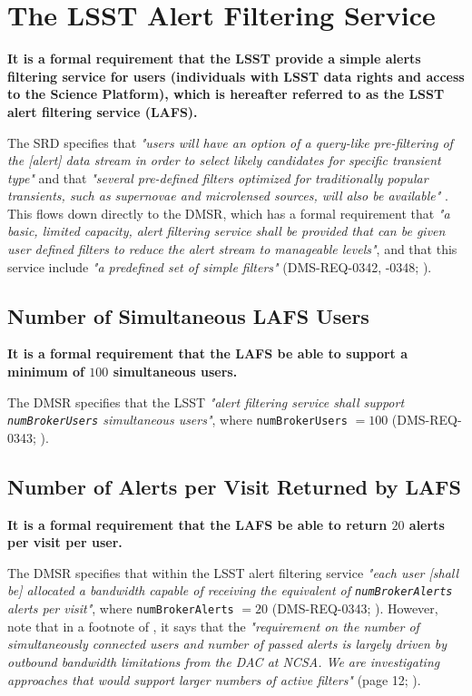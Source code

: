 \documentclass[DM,authoryear,toc]{lsstdoc}
\begin{document}
\section{The LSST Alert Filtering Service} \label{sec:LAFS}

{\bf It is a formal requirement that the LSST provide a simple alerts filtering service for users (individuals with LSST data rights and access to the Science Platform), which is hereafter referred to as the LSST alert filtering service (LAFS).}

The SRD specifies that {\it "users will have an option of a query-like pre-filtering of the [alert] data stream in order to select likely candidates for specific transient type"} and that {\it "several pre-defined filters optimized for traditionally popular transients, such as supernovae and microlensed sources, will also be available"} . This flows down directly to the DMSR, which has a formal requirement that {\it "a basic, limited capacity, alert filtering service shall be provided that can be given user defined filters to reduce the alert stream to manageable levels"}, and that this service include {\it "a predefined set of simple filters"} (DMS-REQ-0342, -0348; ). 


\subsection{Number of Simultaneous LAFS Users}\label{ssec:LAFS_users}

{\bf It is a formal requirement that the LAFS be able to support a minimum of $100$ simultaneous users.}

The DMSR specifies that the LSST {\it "alert filtering service shall support {\tt numBrokerUsers} simultaneous users"}, where {\tt numBrokerUsers} $=100$ (DMS-REQ-0343; ).


\subsection{Number of Alerts per Visit Returned by LAFS}\label{ssec:LAFS_returns}

{\bf It is a formal requirement that the LAFS be able to return $20$ alerts per visit per user.}

The DMSR specifies that within the LSST alert filtering service {\it "each user [shall be] allocated a bandwidth capable of receiving the equivalent of {\tt numBrokerAlerts} alerts per visit"}, where {\tt numBrokerAlerts} $=20$ (DMS-REQ-0343; ). However, note that in a footnote of , it says that the {\it "requirement on the number of simultaneously connected users and number of passed alerts is largely driven by outbound bandwidth limitations from the DAC at NCSA. We are investigating approaches that would support larger numbers of active filters"} (page 12; ).
\end{document}
